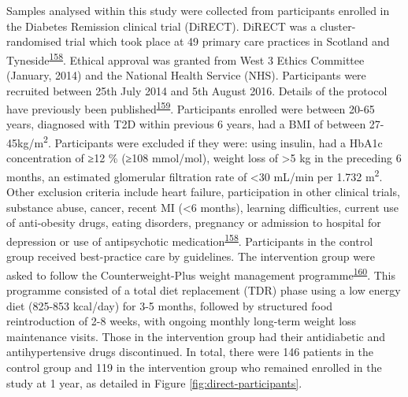 \documentclass[11pt,twoside]{bristolthesis}
\begin{document}
Samples analysed within this study were collected from participants enrolled in the Diabetes Remission clinical trial (DiRECT). DiRECT was a cluster-randomised trial which took place at 49 primary care practices in Scotland and Tyneside\textsuperscript{\protect\hyperlink{ref-Lean2018}{158}}. Ethical approval was granted from West 3 Ethics Committee (January, 2014) and the National Health Service (NHS). Participants were recruited between 25th July 2014 and 5th August 2016. Details of the protocol have previously been published\textsuperscript{\protect\hyperlink{ref-Leslie2016}{159}}. Participants enrolled were between 20-65 years, diagnosed with T2D within previous 6 years, had a BMI of between 27-45kg/m\textsuperscript{2}. Participants were excluded if they were: using insulin, had a HbA1c concentration of ≥12 \% (≥108 mmol/mol), weight loss of \textgreater5 kg in the preceding 6 months, an estimated glomerular filtration rate of \textless30 mL/min per 1.732 m\textsuperscript{2}. Other exclusion criteria include heart failure, participation in other clinical trials, substance abuse, cancer, recent MI (\textless6 months), learning difficulties, current use of anti-obesity drugs, eating disorders, pregnancy or admission to hospital for depression or use of antipsychotic medication\textsuperscript{\protect\hyperlink{ref-Lean2018}{158}}. Participants in the control group received best-practice care by guidelines. The intervention group were asked to follow the Counterweight-Plus weight management programme\textsuperscript{\protect\hyperlink{ref-Lean2013}{160}}. This programme consisted of a total diet replacement (TDR) phase using a low energy diet (825-853 kcal/day) for 3-5 months, followed by structured food reintroduction of 2-8 weeks, with ongoing monthly long-term weight loss maintenance visits. Those in the intervention group had their antidiabetic and antihypertensive drugs discontinued. In total, there were 146 patients in the control group and 119 in the intervention group who remained enrolled in the study at 1 year, as detailed in Figure \ref{fig:direct-participants}.
\end{document}
